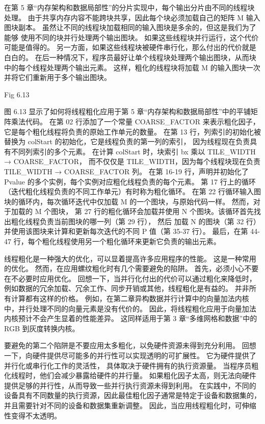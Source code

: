 在第 5 章“内存架构和数据局部性”的分片实现中，每个输出分片由不同的线程块处理。 
由于共享内存内容不能跨块共享，因此每个块必须加载自己的矩阵 M 输入图块副本。
虽然让不同的线程块加载相同的输入图块是多余的，但这是我们为了能够 使用不同的块并行处理两个输出图块。 
如果这些线程块并行运行，这个代价可能是值得的。 另一方面，如果这些线程块被硬件串行化，那么付出的代价就是白白的。 
在后一种情况下，程序员最好让单个线程块处理两个输出图块，从而块中的每个线程处理两个输出元素。 
这样，粗化的线程块将加载 M 的输入图块一次并将它们重新用于多个输出图块。

{\color{red} Fig 6.13}

图 6.13 显示了如何将线程粗化应用于第 5 章“内存架构和数据局部性”中的平铺矩阵乘法代码。 
在第 02 行添加了一个常量 COARSE\_FACTOR 来表示粗化因子，它是每个粗化线程将负责的原始工作单元的数量。 
在第 13 行，列索引的初始化被替换为 colStart 的初始化，它是线程负责的第一列的索引，
因为线程现在负责具有不同列索引的多个元素。 在计算 colStart 时，块索引 bx 乘以 TILE\_WIDTH → COARSE\_FACTOR，
而不仅仅是 TILE\_WIDTH，因为每个线程块现在负责 TILE\_WIDTH → COARSE\_FACTOR 列。 
在第 16-19 行，声明并初始化了 Pvalue 的多个实例，每个实例对应粗化线程负责的每个元素。 
第 17 行上的循环（迭代粗化线程负责的不同工作单元）有时称为粗化循环。 
在第 22 行循环输入图块的循环内，每次循环迭代中仅加载 M 的一个图块，与原始代码一样。 然而，对于加载的 M 个图块，
第 27 行的粗化循环会加载并使用 N 个图块。该循环首先找出粗化线程负责当前图块的哪一列（第 29 行），
然后 加载 N 的图块（第 32 行）并使用该图块来计算和更新每次迭代的不同 P 值（第 35-37 行）。 
最后，在第 44-47 行，每个粗化线程使用另一个粗化循环来更新它负责的输出元素。

线程粗化是一种强大的优化，可以显着提高许多应用程序的性能。 这是一种常用的优化。 
然而，在应用螺纹粗化时有几个需要避免的陷阱。 首先，必须小心不要在不必要时应用优化。 
回想一下，当并行化付出的代价可以通过粗化来降低时，例如数据的冗余加载、冗余工作、同步开销或其他，线程粗化是有益的。 
并非所有计算都有这样的价格。 例如，在第二章异构数据并行计算中的向量加法内核中，并行处理不同的向量元素是没有代价的。 
因此，将线程粗化应用于向量加法内核预计不会产生显着的性能差异。 
这同样适用于第 3 章“多维网格和数据”中的 RGB 到灰度转换内核。

要避免的第二个陷阱是不要应用太多粗化，以免硬件资源未得到充分利用。 
回想一下，向硬件提供尽可能多的并行性可以实现透明的可扩展性。 它为硬件提供了并行化或串行化工作的灵活性，
具体取决于硬件拥有的执行资源量。 当程序员粗化线程时，他们会减少暴露给硬件的并行量。 
如果粗化因子太高，则无法向硬件提供足够的并行性，从而导致一些并行执行资源未得到利用。 
在实践中，不同的设备具有不同数量的执行资源，因此最佳粗化因子通常是特定于设备和数据集的，
并且需要针对不同的设备和数据集重新调整。 因此，当应用线程粗化时，可伸缩性变得不太透明。

